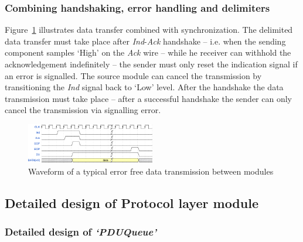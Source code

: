 \documentclass[conference]{IEEEtran}
\begin{document}
\subsubsection{Combining handshaking, error handling and delimiters}

Figure~\ref{fig:data_signals} illustrates data transfer combined with synchronization. The delimited data transfer must take place after \emph{Ind}-\emph{Ack} handshake -- i.e. when the sending component samples `High' on the \emph{Ack} wire --  while he receiver can withhold the acknowledgement indefinitely -- the sender must only reset the indication signal if an error is signalled. The source module can cancel the transmission by transitioning the \emph{Ind} signal back to `Low' level. After the handshake the data transmission must take place -- after a successful handshake the sender can only cancel the transmission via signalling error.

\begin{figure}[!htb]
    \centering
    \includegraphics[width=0.5\textwidth]{figures_raw/data_signals.png}
    \caption{Waveform of a typical error free data transmission between modules}
    \label{fig:data_signals}
\end{figure}


\subsection{Detailed design of Protocol layer module}

\subsubsection{Detailed design of \emph{`PDUQueue'}}\label{subsubsec:PDUQueue_details}
\end{document}
